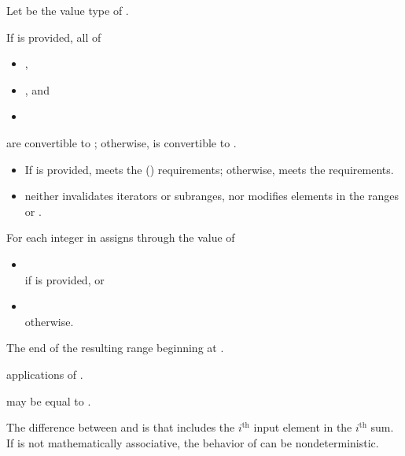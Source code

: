 \begin{itemdescr}
\pnum
Let  be the value type of .

\pnum
\mandates
If  is provided, all of
\begin{itemize}
\item {},
\item {}, and
\item {}
\end{itemize}
are convertible to ;
otherwise, 
is convertible to .

\pnum
\expects
\begin{itemize}
\item
  If  is provided,
   meets the  () requirements;
  otherwise, 
  meets the  requirements.
\item
   neither invalidates iterators or subranges,
  nor modifies elements in
  the ranges  or .
\end{itemize}

\pnum
\effects
For each integer  in 
assigns through  the value of
\begin{itemize}
\item
  \\if {} is provided, or
\item
  \\otherwise.
\end{itemize}

\pnum
\returns
The end of the resulting range beginning at .

\pnum
\complexity
{} applications of .

\pnum
\remarks
{} may be equal to .

\pnum
\begin{note}
The difference between  and  is
that  includes the $i^\text{th}$ input element
in the $i^\text{th}$ sum.
If  is not mathematically associative,
the behavior of  can be nondeterministic.
\end{note}
\end{itemdescr}

